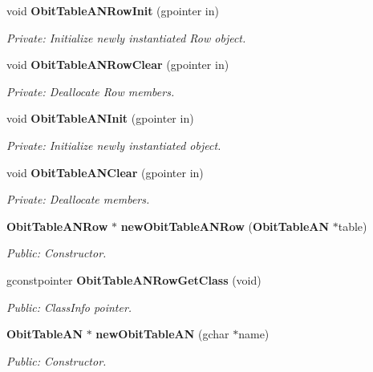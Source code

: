 \begin{CompactItemize}
\item 
void {\bf Obit\-Table\-ANRow\-Init} (gpointer in)
\begin{CompactList}\small\item\em Private: Initialize newly instantiated Row object. \item\end{CompactList}\item 
void {\bf Obit\-Table\-ANRow\-Clear} (gpointer in)
\begin{CompactList}\small\item\em Private: Deallocate Row members. \item\end{CompactList}\item 
void {\bf Obit\-Table\-ANInit} (gpointer in)
\begin{CompactList}\small\item\em Private: Initialize newly instantiated object. \item\end{CompactList}\item 
void {\bf Obit\-Table\-ANClear} (gpointer in)
\begin{CompactList}\small\item\em Private: Deallocate members. \item\end{CompactList}\item 
{\bf Obit\-Table\-ANRow} $\ast$ {\bf new\-Obit\-Table\-ANRow} ({\bf Obit\-Table\-AN} $\ast$table)
\begin{CompactList}\small\item\em Public: Constructor. \item\end{CompactList}\item 
gconstpointer {\bf Obit\-Table\-ANRow\-Get\-Class} (void)
\begin{CompactList}\small\item\em Public: Class\-Info pointer. \item\end{CompactList}\item 
{\bf Obit\-Table\-AN} $\ast$ {\bf new\-Obit\-Table\-AN} (gchar $\ast$name)
\begin{CompactList}\small\item\em Public: Constructor. \item\end{CompactList}\item 

\end{CompactItemize}
